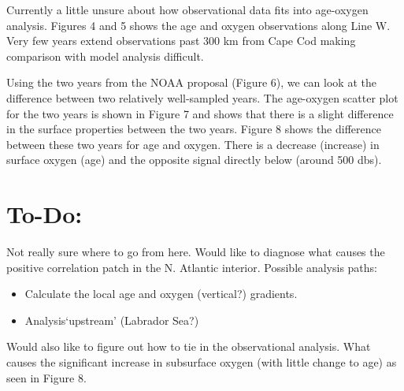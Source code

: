 \documentclass[11pt]{article}
\begin{document}
Currently a little unsure about how observational data fits into age-oxygen
analysis. Figures 4 and 5 shows the age and oxygen observations along Line W.
Very few years extend observations past 300 km from Cape Cod making comparison
with model analysis difficult.

Using the two years from the NOAA proposal (Figure 6), we can look at the difference
between two relatively well-sampled years. The age-oxygen scatter plot for the two
years is shown in Figure 7 and shows that there is a slight difference in the surface
properties between the two years. Figure 8 shows the difference between these two
years for age and oxygen. There is a decrease (increase) in surface oxygen (age)
and the opposite signal directly below (around 500 dbs).

\section*{To-Do:}
Not really sure where to go from here. Would like to diagnose what causes
the positive correlation patch in the N. Atlantic interior. Possible analysis paths:
\begin{itemize}
  \item Calculate the local age and oxygen (vertical?) gradients.
  \item Analysis`upstream' (Labrador Sea?)
\end{itemize}

Would also like to figure out how to tie in the observational analysis. What
causes the significant increase in subsurface oxygen (with little change to
age) as seen in Figure 8. 
\end{document}
